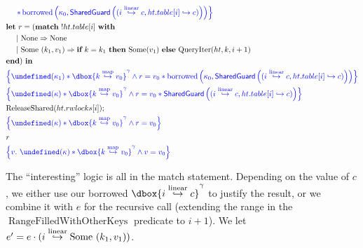 \documentclass{article}
\DeclareMathOperator{\RangeFilledWithOtherKeys}{RangeFilledWithOtherKeys}
\newcommand\dboxed[1]{\dbox{\vphantom{t}\ensuremath{#1}}}
\newcommand{\pointsto}{\hookrightarrow}
\DeclareMathOperator{\borrowed}{borrowed}
\let\active\undefined
\DeclareMathOperator{\active}{active}
\begin{document}
\begin{align*}
  &\inlinehoarer{~~~~
      * \borrowed\left(\kappa_0, \SharedGuard\left( (i \entryto c, ht.table[i] \pointsto c) \right) \right) }\\
  &\langlet r = (\langmatch~ !ht.table[i] ~\langwith\\
  &~~~~ |~ \None \Rightarrow \None\\
  &~~~~ |~ \Some~(k_1,v_1) \Rightarrow
      \langif~ k = k_1 ~\langthen~ \Some(v_1) ~\langelse~ \QueryIter(ht,k,i+1)\\
  &\langend) ~\langin\\
  &\inlinehoare{\active(\kappa_1)
      * \dboxed{k \hashto v_0}^\gamma \land r = v_0
      * \borrowed\left(\kappa_0, \SharedGuard\left( (i \entryto c, ht.table[i] \pointsto c) \right) \right) }\\
  &\inlinehoare{\active(\kappa)
      * \dboxed{k \hashto v_0}^\gamma \land r = v_0
      * \SharedGuard\left( (i \entryto c, ht.table[i] \pointsto c) \right) }\\
  &\ReleaseShared(ht.rwlocks[i]);\\
  &\inlinehoare{\active(\kappa) * \dboxed{k \hashto v_0}^\gamma \land r = v_0}\\
  &r\\
  &\inlinehoare{v.~ \active(\kappa) * \dboxed{k \hashto v_0}^\gamma \land v = v_0}
\end{align*}

\newpage

The ``interesting'' logic is all in the match statement. Depending on the value of $c$, we either use our borrowed $\dboxed{i \entryto c}^\gamma$ to justify the result,
or we combine it with $e$ for the recursive call (extending the range in the $\RangeFilledWithOtherKeys$ predicate to $i+1$).
We let $e' = e \cdot (i \stackrel{\text{linear}}{\hookrightarrow} \text{Some}~(k_1,v_1))$.
\end{document}

